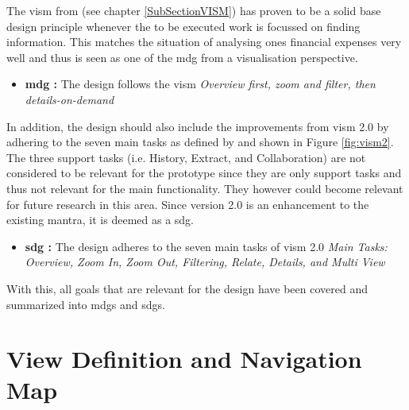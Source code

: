 The \gls{vism} from \cite{Shneiderman2005} (see chapter \ref{SubSectionVISM}) has proven to be a solid base design principle whenever the to be executed work is focussed on finding information. This matches the situation of analysing ones financial expenses very well and thus is seen as one of the \gls{mdg} from a visualisation perspective.
\begin{itemize}[noitemsep,nolistsep]
	\item \textbf{\gls{mdg} :} The design follows the \gls{vism} \newline
		\textit{Overview first, zoom and filter, then details-on-demand}
\end{itemize}
In addition, the design should also include the improvements from \gls{vism} 2.0 by adhering to the seven main tasks as defined by \cite{Stauffer2016} and shown in Figure \ref{fig:vism2}. The three support tasks (i.e. History, Extract, and Collaboration) are not considered to be relevant for the prototype since they are only support tasks and thus not relevant for the main functionality. They however could become relevant for future research in this area. Since version 2.0 is an enhancement to the existing mantra, it is deemed as a \gls{sdg}.
\begin{itemize}[noitemsep,nolistsep]
	\item \textbf{\gls{sdg} :} The design adheres to the seven main tasks of \gls{vism} 2.0 \newline
		\textit{Main Tasks: Overview, Zoom In, Zoom Out, Filtering, Relate, Details, and Multi View}
\end{itemize}

\addtocounter{MainDesignGoalCounter}{-1}
\addtocounter{SubDesignGoalCounter}{-1}
With this, all goals that are relevant for the design have been covered and summarized into  \glspl{mdg} and  \glspl{sdg}.



\section{View Definition and Navigation Map}


